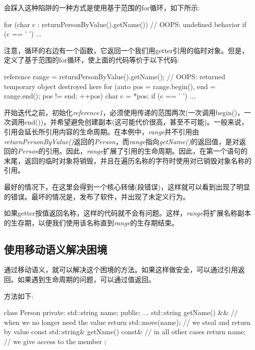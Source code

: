 会踩入这种陷阱的一种方式是使用基于范围的for循环，如下所示:

\begin{cppcode}
for (char c : returnPersonByValue().getName()) { // OOPS: undefined behavior
	if (c == ' ') {
		...
	}
}
\end{cppcode}

注意，循环的右边有一个函数，它返回一个我们用getter引用的临时对象。但是，定义了基于范围的for循环，使上面的代码等价于以下代码:

\begin{cppcode}
reference range = returnPersonByValue().getName();
// OOPS: returned temporary object destroyed here
for (auto pos = range.begin(), end = range.end(); pos != end; ++pos) {
	char c = *pos;
	if (c == ' ') {
		...
	}
}
\end{cppcode}

开始迭代之前，初始化\textit{reference1}，必须使用传递的范围两次(一次调用begin()，一次调用end())，并希望避免创建副本(这可能代价很高，甚至不可能)。一般来说，引用会延长所引用内容的生命周期。在本例中，\textit{range}并不引用由\textit{returnPersonByValue()}返回的\textit{Person}，而\textit{range}指向\textit{getName()}的返回值，是对返回的\textit{Person}的引用。因此，\textit{range}扩展了引用的生命周期。因此，在第一个语句的末尾，返回的临时对象将销毁，并且在遍历名称的字符时使用对已销毁对象名称的引用。

最好的情况下，在这里会得到一个核心转储(段错误)，这样就可以看到出现了明显的错误。最坏的情况是，发布了软件，并出现了未定义行为。

如果getter按值返回名称，这样的代码就不会有问题。这样，\textit{range}将扩展名称副本的生存期，以便我们使用该名称直到\textit{range}的生存期结束。

\subsection{使用移动语义解决困境}

通过移动语义，就可以解决这个困境的方法。如果这样做安全，可以通过引用返回。如果遇到生命周期的问题，可以通过值返回。

方法如下:

\begin{cppcode}
class Person
{
private:
	std::string name;
public:
	...
	std::string getName() && { // when we no longer need the value
		return std::move(name); // we steal and return by value
	}
	const std::string& getName() const& { // in all other cases
		return name; // we give access to the member
	}
};
\end{cppcode}

